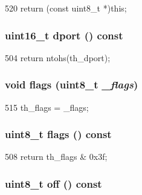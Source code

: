 \begin{DoxyCode}
520 { return (const uint8_t *)this; }
\end{DoxyCode}
\hypertarget{structNet_1_1TcpHdr_aba1e568ee57bc49dc901f0beb54a62af}{
\subsubsection[{dport}]{\setlength{\rightskip}{0pt plus 5cm}uint16\_\-t dport () const}}
\label{structNet_1_1TcpHdr_aba1e568ee57bc49dc901f0beb54a62af}



\begin{DoxyCode}
504 { return ntohs(th_dport); }
\end{DoxyCode}
\hypertarget{structNet_1_1TcpHdr_aeaeb21104a163e0151ec998def60ffad}{
\subsubsection[{flags}]{\setlength{\rightskip}{0pt plus 5cm}void flags (uint8\_\-t {\em \_\-flags})}}
\label{structNet_1_1TcpHdr_aeaeb21104a163e0151ec998def60ffad}



\begin{DoxyCode}
515 { th_flags  = _flags; } 
\end{DoxyCode}
\hypertarget{structNet_1_1TcpHdr_a54191ca9612c1e21fbc7e3133792a809}{
\subsubsection[{flags}]{\setlength{\rightskip}{0pt plus 5cm}uint8\_\-t flags () const}}
\label{structNet_1_1TcpHdr_a54191ca9612c1e21fbc7e3133792a809}



\begin{DoxyCode}
508 { return th_flags & 0x3f; }
\end{DoxyCode}
\hypertarget{structNet_1_1TcpHdr_a3f7bd9781841d27d2dd7d69b8c666b34}{
\subsubsection[{off}]{\setlength{\rightskip}{0pt plus 5cm}uint8\_\-t off () const}}
\label{structNet_1_1TcpHdr_a3f7bd9781841d27d2dd7d69b8c666b34}



